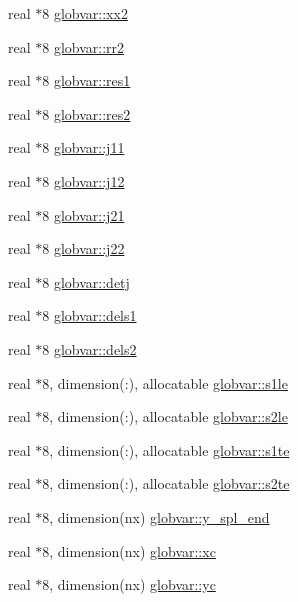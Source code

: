 \begin{DoxyCompactItemize}
real $\ast$8 \hyperlink{namespaceglobvar_a6b2d075e483f21e7f6949da41ccf8cf0}{globvar\+::xx2}
\item 
real $\ast$8 \hyperlink{namespaceglobvar_a7f8c759616a63ffb90fff7d59c3b86df}{globvar\+::rr2}
\item 
real $\ast$8 \hyperlink{namespaceglobvar_a061d2d5ab0ada1bf7d569fc739a0a606}{globvar\+::res1}
\item 
real $\ast$8 \hyperlink{namespaceglobvar_a790f59208130ab4a445361a5da0d3d02}{globvar\+::res2}
\item 
real $\ast$8 \hyperlink{namespaceglobvar_abb2a2320c8ef742d4a1a19b3b8ce1864}{globvar\+::j11}
\item 
real $\ast$8 \hyperlink{namespaceglobvar_a6dfce235cdc192123bf42b21e53f41d9}{globvar\+::j12}
\item 
real $\ast$8 \hyperlink{namespaceglobvar_a9d00e21e59370e3169e0b653c79172be}{globvar\+::j21}
\item 
real $\ast$8 \hyperlink{namespaceglobvar_af0f613b41460f29b7c3d35ea0a0c25b6}{globvar\+::j22}
\item 
real $\ast$8 \hyperlink{namespaceglobvar_a3325ded52e870c164b21a3c720bbe1b6}{globvar\+::detj}
\item 
real $\ast$8 \hyperlink{namespaceglobvar_a2e4dc380073673328e48ca1cc486e306}{globvar\+::dels1}
\item 
real $\ast$8 \hyperlink{namespaceglobvar_a76bb9ea1cf09a1a5737acf2a57ffaa74}{globvar\+::dels2}
\item 
real $\ast$8, dimension(\+:), allocatable \hyperlink{namespaceglobvar_a017229d1a37091ea8dac7e17f605f980}{globvar\+::s1le}
\item 
real $\ast$8, dimension(\+:), allocatable \hyperlink{namespaceglobvar_a56cea75eae9b813c72f7b81943739f7a}{globvar\+::s2le}
\item 
real $\ast$8, dimension(\+:), allocatable \hyperlink{namespaceglobvar_a2c17a89a6df336f0e78a4ec060a7af98}{globvar\+::s1te}
\item 
real $\ast$8, dimension(\+:), allocatable \hyperlink{namespaceglobvar_aecd5a79b6e1e9b517f57dcd7a03a513c}{globvar\+::s2te}
\item 
real $\ast$8, dimension(nx) \hyperlink{namespaceglobvar_a5512ca98f844211a8ecb85b0be7168cc}{globvar\+::y\+\_\+spl\+\_\+end}
\item 
real $\ast$8, dimension(nx) \hyperlink{namespaceglobvar_a69b897237929c1e1095f61f9da69c152}{globvar\+::xc}
\item 
real $\ast$8, dimension(nx) \hyperlink{namespaceglobvar_aa12e45433bb052d282ad478af9f88e3a}{globvar\+::yc}

\end{DoxyCompactItemize}
